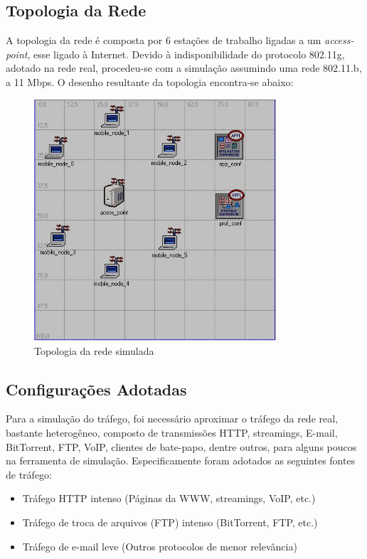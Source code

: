 \documentclass[brazil,times,12pt]{abnt}
\begin{document}
\subsection*{Topologia da Rede}
A topologia da rede é composta por 6 estações de trabalho ligadas a um
\emph{access-point}, esse ligado à Internet. Devido à indisponibilidade do
protocolo 802.11g, adotado na rede real, procedeu-se com a simulação assumindo
uma rede 802.11.b, a 11 Mbps. O desenho resultante da topologia encontra-se
abaixo:

\begin{figure}[htp]
\begin{center}
  \includegraphics[width=90mm]{SimulacaoRede/Topologia.jpg}
  \caption[topologia-rede]{Topologia da rede simulada}
  \label{topologia-rede}
\end{center}
\end{figure}

\subsection*{Configurações Adotadas}
Para a simulação do tráfego, foi necessário aproximar o tráfego da rede real,
bastante heterogêneo, composto de transmissões HTTP, streamings, E-mail,
BitTorrent, FTP, VoIP, clientes de bate-papo, dentre outros, para alguns poucos
na ferramenta de simulação. Especificamente foram adotados as seguintes fontes de tráfego:

\begin{itemize}
  \item Tráfego HTTP intenso (Páginas da WWW, streamings, VoIP, etc.)
  \item Tráfego de troca de arquivos (FTP) intenso (BitTorrent, FTP, etc.)
  \item Tráfego de e-mail leve (Outros protocolos de menor relevância)
\end{itemize}
\end{document}
